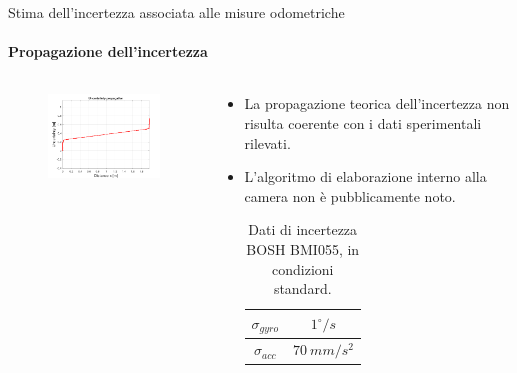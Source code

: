 \documentclass{beamer}
\begin{document}
\begin{frame}{Stima dell'incertezza associata alle misure odometriche}
\framesubtitle{Propagazione dell'incertezza}
\begin{columns}
    \begin{column}{0.6\textwidth}
    \begin{figure}
            \centering
            \includegraphics[width=8cm]{images/propagation.png}
            \label{fig:staticpos}
        \end{figure}
        
    \end{column}
    \begin{column}{0.4\textwidth}
    \begin{itemize}
        \item La propagazione teorica dell'incertezza non risulta coerente con i dati sperimentali rilevati.
        \item L'algoritmo di elaborazione interno alla camera non è pubblicamente noto.
        \begin{table}[]
            \centering
            \begin{tabular}{|c |c|}
            \hline
               $\sigma_{gyro}$  & $1^{\circ}/s$ \\
               \hline
               $\sigma_{acc}$ & $70\ mm/s^{2}$\\
               \hline
            \end{tabular}
            \caption{Dati di incertezza BOSH BMI055, in condizioni standard.}
        \end{table}
    \end{itemize}
    \end{column}
\end{columns}
\end{frame}
\end{document}
